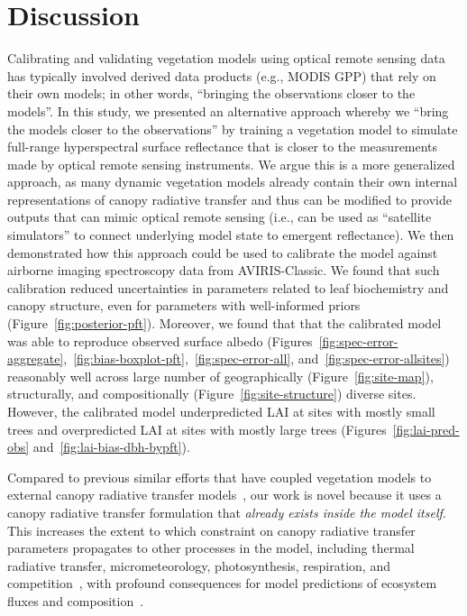 \section{Discussion}

Calibrating and validating vegetation models using optical remote sensing data has typically involved derived data products (e.g., MODIS GPP) that rely on their own models;
in other words, ``bringing the observations closer to the models''.
In this study, we presented an alternative approach whereby we ``bring the models closer to the observations'' by training a vegetation model to simulate full-range hyperspectral surface reflectance that is closer to the measurements made by optical remote sensing instruments.
We argue this is a more generalized approach, as many dynamic vegetation models already contain their own internal representations of canopy radiative transfer and thus can be modified to provide outputs that can mimic optical remote sensing (i.e., can be used as ``satellite simulators'' to connect underlying model state to emergent reflectance).
We then demonstrated how this approach could be used to calibrate the model against airborne imaging spectroscopy data from AVIRIS-Classic.
We found that such calibration reduced uncertainties in parameters related to leaf biochemistry and canopy structure, even for parameters with well-informed priors (Figure~\ref{fig:posterior-pft}).
Moreover, we found that that the calibrated model was able to reproduce observed surface albedo
(Figures~\ref{fig:spec-error-aggregate},~\ref{fig:bias-boxplot-pft},~\ref{fig:spec-error-all}, and~\ref{fig:spec-error-allsites})
reasonably well across large number of geographically (Figure~\ref{fig:site-map}), structurally, and compositionally (Figure~\ref{fig:site-structure}) diverse sites.
However, the calibrated model underpredicted LAI at sites with mostly small trees and overpredicted LAI at sites with mostly large trees (Figures~\ref{fig:lai-pred-obs} and~\ref{fig:lai-bias-dbh-bypft}).

Compared to previous similar efforts that have coupled vegetation models to external canopy radiative transfer models~\citep{knorr2001assimilation, nouvellon2001coupling, quaife2008assimilating},
our work is novel because it uses a canopy radiative transfer formulation that \emph{already exists inside the model itself}.
This increases the extent to which constraint on canopy radiative transfer parameters propagates to other processes in the model,
including thermal radiative transfer, micrometeorology, photosynthesis, respiration, and competition~\citep{longo2019ed2description}, with profound consequences for model predictions of ecosystem fluxes and composition~\citep{viskari_2019_influence}.

